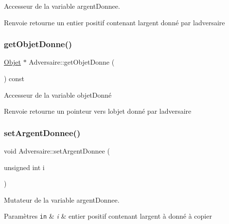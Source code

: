 Accesseur de la variable argent\+Donnee. 

\begin{DoxyReturn}{Renvoie}
retourne un entier positif contenant l\textquotesingle{}argent donné par l\textquotesingle{}adversaire 
\end{DoxyReturn}
\mbox{\label{class_adversaire_a3d500d03df6faf0b30c8be33561f0942}} 
\subsubsection{\texorpdfstring{get\+Objet\+Donne()}{getObjetDonne()}}
{\footnotesize\ttfamily \hyperlink{class_objet}{Objet} $\ast$ Adversaire\+::get\+Objet\+Donne (\begin{DoxyParamCaption}{ }\end{DoxyParamCaption}) const}



Accesseur de la variable objet\+Donné 

\begin{DoxyReturn}{Renvoie}
retourne un pointeur vers l\textquotesingle{}objet donné par l\textquotesingle{}adversaire 
\end{DoxyReturn}
\mbox{\label{class_adversaire_ab8371ffdc0fc9a934212e05fbf3fedc2}} 
\subsubsection{\texorpdfstring{set\+Argent\+Donnee()}{setArgentDonnee()}}
{\footnotesize\ttfamily void Adversaire\+::set\+Argent\+Donnee (\begin{DoxyParamCaption}\item[{unsigned int}]{i }\end{DoxyParamCaption})}



Mutateur de la variable argent\+Donnee. 


\begin{DoxyParams}[1]{Paramètres}
\mbox{\tt in}  & {\em i} & entier positif contenant l\textquotesingle{}argent à donné à copier \\
\hline
\end{DoxyParams}
\mbox{\label{class_adversaire_a96bed950b5172bbda0a2ddab2b1ff68c}} 
